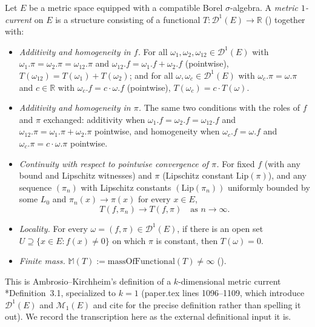 \begin{definition}
  Let $E$ be a metric space equipped with a compatible Borel $\sigma$-algebra. A \emph{metric
  $1$-current} on $E$ is a structure consisting of a functional $T \colon \mathcal{D}^1(E) \to
  \mathbb{R}$ () together with:
  \begin{itemize}
    \item \emph{Additivity and homogeneity in $f$.} For all $\omega_1,\omega_2,\omega_{12} \in
      \mathcal{D}^1(E)$ with $\omega_1.\pi = \omega_2.\pi = \omega_{12}.\pi$ and $\omega_{12}.f =
      \omega_1.f + \omega_2.f$ (pointwise), $T(\omega_{12}) = T(\omega_1) + T(\omega_2)$; and for
      all $\omega,\omega_c \in \mathcal{D}^1(E)$ with $\omega_c.\pi = \omega.\pi$ and $c \in
      \mathbb{R}$ with $\omega_c.f = c\cdot\omega.f$ (pointwise), $T(\omega_c) = c\cdot T(\omega)$.
    \item \emph{Additivity and homogeneity in $\pi$.} The same two conditions with the roles of
      $f$ and $\pi$ exchanged: additivity when $\omega_1.f=\omega_2.f=\omega_{12}.f$ and
      $\omega_{12}.\pi = \omega_1.\pi + \omega_2.\pi$ pointwise, and homogeneity when
      $\omega_c.f=\omega.f$ and $\omega_c.\pi = c\cdot\omega.\pi$ pointwise.
    \item \emph{Continuity with respect to pointwise convergence of $\pi$.} For fixed $f$ (with
      any bound and Lipschitz witnesses) and $\pi$ (Lipschitz constant $\mathrm{Lip}(\pi)$), and
      any sequence $(\pi_n)$ with Lipschitz constants $(\mathrm{Lip}(\pi_n))$ uniformly bounded by
      some $L_0$ and $\pi_n(x) \to \pi(x)$ for every $x \in E$,
      \[
        T(f,\pi_n) \to T(f,\pi) \quad \text{as } n \to \infty
        .
      \]
    \item \emph{Locality.} For every $\omega=(f,\pi) \in \mathcal{D}^1(E)$, if there is an open set
      $U \supseteq \{x \in E : f(x) \neq 0\}$ on which $\pi$ is constant, then $T(\omega) = 0$.
    \item \emph{Finite mass.} $\mathbb{M}(T) := \mathrm{massOfFunctional}(T) \neq \infty$
      ().
  \end{itemize}
  This is Ambrosio--Kirchheim's definition of a $k$-dimensional metric current
  \cite{AmbrosioKirchheim}*{Definition~3.1}, specialized to $k=1$ (paper.tex lines 1096--1109, which introduce
  $\mathcal{D}^1(E)$ and $\mathcal{M}_1(E)$ and cite \cite{AmbrosioKirchheim} for the precise
  definition rather than spelling it out). We record the transcription here as the external
  definitional input it is.


\end{definition}
